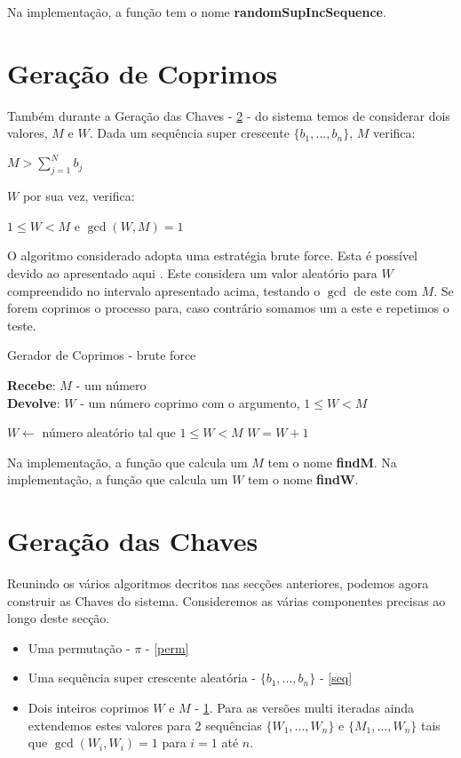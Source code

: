 \documentclass[11pt, language=portuguese]{report}
\begin{document}
Na implementação, a função tem o nome \textbf{randomSupIncSequence}.

\section{Geração de Coprimos}
\label{coprimos}

Também durante a Geração das Chaves - \ref{gkey} - do sistema temos de considerar dois valores, $M$ e $W$.
Dada um sequência super crescente $\{b_1, ..., b_n\}$, $M$ verifica:
\begin{center}
	$M > \sum_{j = 1}^{N} b_j$
\end{center}

$W$ por sua vez, verifica:
\begin{center}
        $1 \leq W < M$ e $ \gcd(W,M) = 1 $
\end{center}

O algoritmo considerado adopta uma estratégia brute force. Esta é possível devido ao apresentado aqui \autocite{stackex}. Este considera um valor aleatório para $W$ compreendido no intervalo apresentado acima, testando o $\gcd$ de este com $M$. Se forem coprimos o processo para, caso contrário somamos um a este e repetimos o teste. 

\begin{algorithm}[H]
	\caption{Gerador de Coprimos - brute force}
	\textbf{Recebe}: $M$ - um número\\
	\textbf{Devolve}: $W$ - um número coprimo com o argumento, $1 \le W < M$
	\begin{algorithmic}[1]
		\State $W \gets$ número aleatório tal que $1 \le W < M$	
			\State $W = W + 1$
		\EndWhile
	\end{algorithmic}
\end{algorithm}

Na implementação, a função que calcula um $M$ tem o nome \textbf{findM}.
Na implementação, a função que calcula um $W$ tem o nome \textbf{findW}.

\section{Geração das Chaves}
\label{gkey}
Reunindo os vários algoritmos decritos nas secções anteriores, podemos agora construir as Chaves do sistema.
Consideremos as várias componentes precisas ao longo deste secção.
\begin{itemize}
	\item Uma permutação - $\pi$ - \ref{perm}
	\item Uma sequência super crescente aleatória - $\{b_1, ..., b_n\}$ - \ref{seq} 
	\item Dois inteiros coprimos $W$ e $M$ - \ref{coprimos}. Para as versões multi iteradas ainda extendemos estes valores para 2 sequências $\{W_1, ..., W_n\}$ e $\{M_1, ..., W_n\}$ tais que $\gcd(W_i, W_i) = 1$ para $i = 1$ até $n$.  
\end{itemize}
\end{document}
